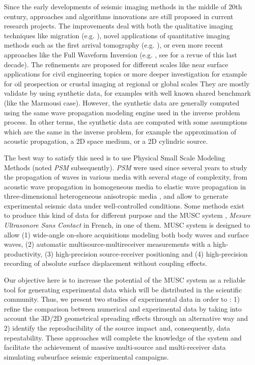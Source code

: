 \documentclass[manuscript,revised]{geophysics}
\newcommand{\psm}{\textit{PSM} }
\newcommand{\thrd}{three-dimensional }
\begin{document}
\noindent Since the early developments of seismic imaging methods in the middle of 20th century, approaches and algorithms innovations are still proposed in current research projects. The improvements deal with both the qualitative imaging techniques like migration (e.g. \citet{Berkhout_MSS_2012,Guofeng_GPU_2013}), novel applications of quantitative imaging methods such as the first arrival tomography (e.g. \citet{Bohm_CWS_2015}), or even more recent approaches like the Full Waveform Inversion (e.g. \citet{Perez_AWI_2014}, see \citet{Virieux_FWI_2009} for a revue of this last decade). The refinements are proposed for different scales like near surface applications for civil engineering topics or more deeper investigation for example for oil prospection or crustal imaging at regional or global scales They are mostly validate by using synthetic data, for examples with well known shared benchmark (like the Marmousi case). However, the synthetic data are generally computed using the same wave propagation modeling engine used in the inverse problem process. In other terms, the synthetic data are computed with some assumptions which are the same in the inverse problem, for example the approximation of acoustic propagation, a 2D space medium, or a 2D cylindric source.

\noindent The best way to satisfy this need is to use Physical Small Scale Modeling Methods (noted \psm subsequently). \psm were used since several years to study the propagation of waves in various media with several stage of complexity, from acoustic wave propagation in homogeneous media to elastic wave propagation in \thrd heterogeneous anisotropic media \citep{Rieber_EWP_1936,Howes_SMS_1953,Hilterman_TDM_1970,French_MRP_1974,Bishop_LVM_1985,Pratt_FWI_1999,Favretto_NMT_2013,Sarkar_TPM_2003,Isaac_SMS_1999}, and allow to generate experimental seismic data under well-controlled conditions. Some methods exist to produce this kind of data for different purpose \citep{Wong_SPM_2009} and the MUSC system \citep{Bretaudeau_SSA_2008b,Bretaudeau_SSM_2011,Bretaudeau_FWI_2013}, \textit{Mesure Ultrasonore Sans Contact} in French, in one of them. MUSC system is designed to allow (1) wide-angle on-shore acquisitions modeling both body waves and surface waves, (2) automatic multisource-multireceiver measurements with a high-productivity, (3) high-precision source-receiver positioning and (4) high-precision recording of absolute surface displacement without coupling effects. 

\noindent Our objective here is to increase the potential of the MUSC system as a reliable tool for generating experimental data which will be distributed in the scientific community. 
\noindent Thus, we present two studies of experimental data in order to : 1) refine the comparison between numerical and experimental data by taking into account the 3D/2D geometrical spreading effects through an alternative way and 2) identify the reproducibility of the source impact and, consequently, data repeatability. These approaches will complete the knowledge of the system and facilitate the achievement of massive multi-source and multi-receiver data simulating subsurface seismic experimental campaigns.
\end{document}
